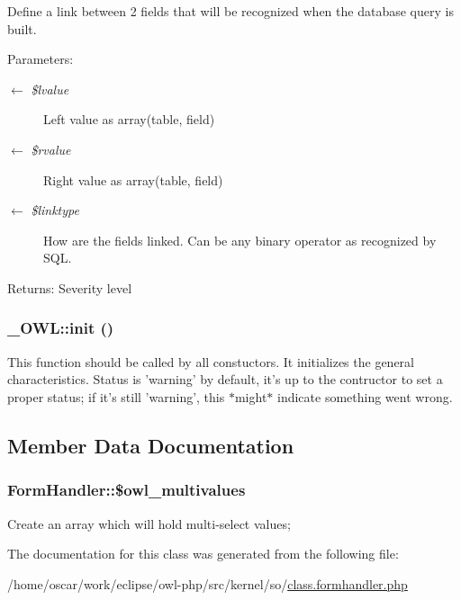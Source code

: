Define a link between 2 fields that will be recognized when the database query is built.

\begin{Desc}
\item[Parameters:]
\begin{description}
\item[\mbox{$\leftarrow$} {\em \$lvalue}]Left value as array(table, field) \item[\mbox{$\leftarrow$} {\em \$rvalue}]Right value as array(table, field) \item[\mbox{$\leftarrow$} {\em \$linktype}]How are the fields linked. Can be any binary operator as recognized by SQL. \end{description}
\end{Desc}
\begin{Desc}
\item[Returns:]Severity level \end{Desc}
\hypertarget{class__OWL_e0ef3ded56e8a6b34b6461e5a721cd3e}{
\subsubsection{\setlength{\rightskip}{0pt plus 5cm}\_\-OWL::init ()}}
\label{class__OWL_e0ef3ded56e8a6b34b6461e5a721cd3e}


This function should be called by all constuctors. It initializes the general characteristics. Status is 'warning' by default, it's up to the contructor to set a proper status; if it's still 'warning', this $\ast$might$\ast$ indicate something went wrong. 

\subsection{Member Data Documentation}
\hypertarget{classFormHandler_7aa914557e2c76b46e4e0601c5dd75d5}{
\subsubsection{\setlength{\rightskip}{0pt plus 5cm}FormHandler::\$owl\_\-multivalues}}
\label{classFormHandler_7aa914557e2c76b46e4e0601c5dd75d5}


Create an array which will hold multi-select values; 

The documentation for this class was generated from the following file:\begin{CompactItemize}
\item 
/home/oscar/work/eclipse/owl-php/src/kernel/so/\hyperlink{class_8formhandler_8php}{class.formhandler.php}\end{CompactItemize}
